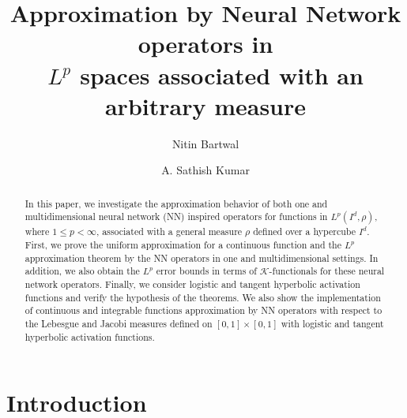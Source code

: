 \documentclass[12pt, reqno]{amsart}
\numberwithin{equation}{section}
\theoremstyle{definition}
\theoremstyle{remark}
\numberwithin{equation}{section}
\begin{document}
\title[Neural Network operators with respect to arbitrary measures]{Approximation by Neural Network operators in\\ $L^p$ spaces associated with an arbitrary measure}

\author{Nitin Bartwal}

\address{Department of Mathematics, Indian Institute of Technology Madras, Chennai-600036, Tamil Nadu, India}

\author{A. Sathish Kumar}

\address{Department of Mathematics, Indian Institute of Technology Madras, Chennai-600036, Tamil Nadu, India}



\begin{abstract}

   In this paper, we investigate the approximation behavior of both one and multidimensional neural network (NN) inspired operators for functions in $L^p(I^d,\rho)$, where $1\leq p<\infty$, associated with a general measure $\rho$ defined over a hypercube $I^d$. First, we prove the uniform approximation for a continuous function and the $L^p$ approximation theorem by the NN operators in one and multidimensional settings. In addition, we also obtain the $L^p$ error bounds in terms of $\mathcal{K}$-functionals for these neural network operators. Finally, we consider logistic and tangent hyperbolic activation functions and verify the hypothesis of the theorems. We also show the implementation of continuous and integrable functions approximation by NN operators with respect to the Lebesgue and Jacobi measures defined on $[0,1]\times[0,1]$ with logistic and tangent hyperbolic activation functions. 
\end{abstract}


\maketitle

\section{Introduction}
\end{document}
